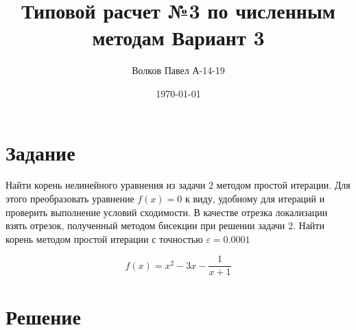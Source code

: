 \documentclass[a4paper,12pt]{report} %
\author{Волков Павел А-14-19}
\title{Типовой расчет №3 по численным методам Вариант 3}
\date{\today}
\begin{document}

\maketitle

\newpage
\section*{Задание}
Найти корень нелинейного уравнения из задачи 2 методом простой итерации. Для этого преобразовать уравнение $f(x) = 0$ к виду, удобному для итераций и проверить выполнение условий сходимости. В качестве отрезка локализации взять отрезок, полученный методом бисекции при решении задачи 2. Найти корень методом простой итерации с точностью $\varepsilon = 0.0001$

\[
	f(x) = x^2 - 3x - \frac{1}{x + 1}
\]
\section*{Решение}
\end{document}
